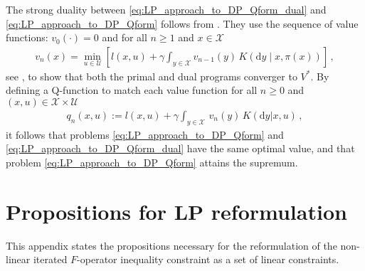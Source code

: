 \documentclass[journal]{IEEEtran}
\newcommand{\mcal}{\mathcal}
\newcommand{\textQ}{Q}
\newcommand{\intd}[1]{\mathrm{d}#1}
\newcommand{\spaceXbyU}{\mathcal{X}\times\mathcal{U}}
\begin{document}
\begin{IEEEproof}
	The strong duality between \eqref{eq:LP_approach_to_DP_Qform_dual} and \eqref{eq:LP_approach_to_DP_Qform} follows from \cite[Theorem 6.3.8]{hernandez_2012_discreteTimeMCP}. They use the sequence of value functions: $v_0(\cdot)=0$ and for all $n \geq 1$ and $x\in\mcal{X}$
		\begin{equation} \nonumber
			\begin{aligned}
				v_{n}(x) = \min_{u\in\mcal{U}} \left[ l(x,u) + \gamma  \int\nolimits_{y\in\mcal{X}} v_{n-1}(y) \, K\left( \intd{y} \middle| x,\pi(x) \right) \right]
				\,,
			\end{aligned}
		\end{equation}
	see \cite[equation 6.3.38]{hernandez_2012_discreteTimeMCP}, to show that both the primal and dual programs converger to $V^\ast$.
By defining a \textQ-function to match each value function for all $n \geq 0$ and $(x,u) \!\in\! \spaceXbyU$
		\begin{equation} \nonumber
			\begin{aligned}
				q_{n}(x,u) := l(x,u) + \gamma \int\nolimits_{y\in\mcal{X}} \, v_{n}(y) \, K(\intd{y}|x,u)
					\,,
			\end{aligned}
		\end{equation}
	it follows that problems \eqref{eq:LP_approach_to_DP_Qform} and \eqref{eq:LP_approach_to_DP_Qform_dual} have the same optimal value, and that problem \eqref{eq:LP_approach_to_DP_Qform} attains the supremum.
\end{IEEEproof}


 




\section{Propositions for LP reformulation} \label{app:LPreformulation_propositions}

This appendix states the propositions necessary for the reformulation of the non-linear iterated $F$-operator inequality constraint as a set of linear constraints.
\end{document}
